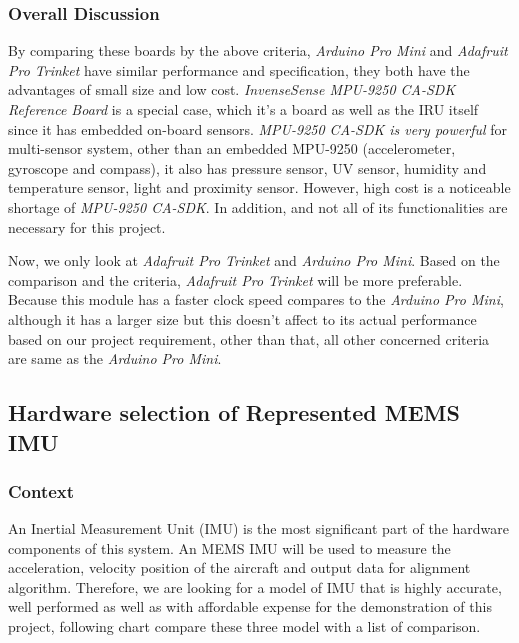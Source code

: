 \hfill \break
\subsubsection{Overall Discussion}
By comparing these boards by the above criteria, \textit{Arduino Pro Mini} and \textit{Adafruit Pro Trinket} have similar performance and specification, they both have the advantages of small size and low cost. \textit{InvenseSense MPU-9250 CA-SDK Reference Board} is a special case, which it’s a board as well as the IRU itself since it has embedded on-board sensors. \textit{MPU-9250 CA-SDK is very powerful} for multi-sensor system, other than an embedded MPU-9250 (accelerometer, gyroscope and compass), it also has pressure sensor, UV sensor, humidity and temperature sensor, light and proximity sensor. However, high cost is a noticeable shortage of \textit{MPU-9250 CA-SDK}. In addition, and not all of its functionalities are necessary for this project.

Now, we only look at \textit{Adafruit Pro Trinket} and \textit{Arduino Pro Mini}. Based on the comparison and the criteria, \textit{Adafruit Pro Trinket} will be more preferable. Because this module has a faster clock speed compares to the \textit{Arduino Pro Mini}, although it has a larger size but this doesn’t affect to its actual performance based on our project requirement, other than that, all other concerned criteria are same as the \textit{Arduino Pro Mini}.



\subsection{Hardware selection of Represented MEMS IMU}
\subsubsection{Context}
An Inertial Measurement Unit (IMU) is the most significant part of the hardware components of this system. An MEMS IMU will be used to measure the acceleration, velocity position of the aircraft and output data for alignment algorithm. Therefore, we are looking for a model of IMU that is highly accurate, well performed as well as with affordable expense for the demonstration of this project, following chart compare these three model with a list of comparison.\\

